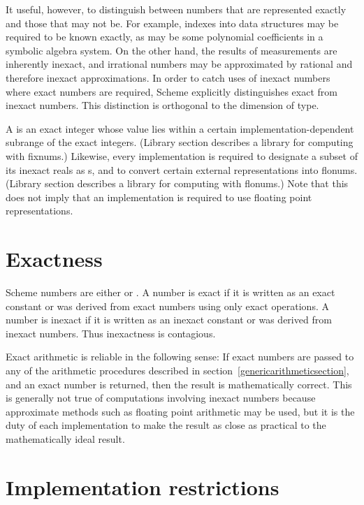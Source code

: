It useful, however, to distinguish between numbers that are
represented exactly and those that may not be.  For example, indexes
into data structures may be required to be known exactly, as may be some polynomial
coefficients in a symbolic algebra system.  On the other hand, the
results of measurements are inherently inexact, and irrational numbers
may be approximated by rational and therefore inexact approximations.
In order to catch uses of inexact numbers where exact numbers are
required, Scheme explicitly distinguishes exact from inexact numbers.
This distinction is orthogonal to the dimension of type.

A  is an exact integer whose value lies
within a certain implementation-dependent subrange of the
exact integers. (Library section  describes a
library for computing with fixnums.)
Likewise, every implementation is required
to designate a subset of its inexact reals as s, and
to convert certain external representations into flonums.  
(Library section  describes a library for
computing with flonums.)  Note that
this does not imply that an implementation is required to use
floating point representations.

\section{Exactness}
\label{exactly}

 Scheme numbers are either  or
.  A number is exact if it is written as an exact
constant or was derived from exact numbers using only exact
operations.  A number is inexact if it is written as an inexact
constant or was derived from inexact numbers.  Thus inexactness is
contagious.  

Exact arithmetic is reliable in the following sense:
If exact numbers are passed to any of the arithmetic procedures
described in section~\ref{genericarithmeticsection}, and an
exact number is returned, then the result is mathematically
correct.
This is generally not true of
computations involving inexact numbers because approximate methods
such as floating point arithmetic may be used, but it is the duty of
each implementation to make the result as close as practical to the
mathematically ideal result.

\section{Implementation restrictions}


